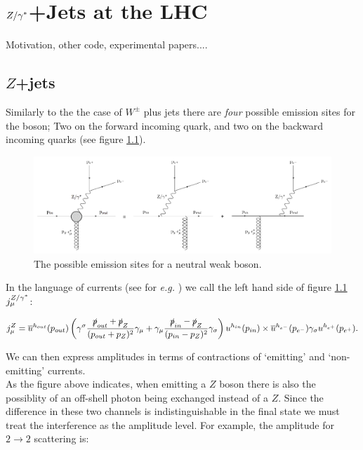 \chapter{${Z/\gamma^*}$+Jets at the LHC}
\label{chap:Zs}

	Motivation, other code, experimental papers....

	\section{$Z$+jets}
	\label{sec:Zcurrents}

		Similarly to the the case of $W^\pm$ plus jets there are \emph{four} possible emission sites for the boson; Two on the forward incoming quark, and two on the backward incoming quarks (see figure \ref{fig:emissionsites}).

		\begin{figure}[h]
		\includegraphics[width=0.98\linewidth]{figures/EmissionSites.pdf}
		\caption{The possible emission sites for a neutral weak boson.}
		\label{fig:emissionsites}
		\end{figure}

		In the language of currents (see for \emph{e.g.} \cite{Constructing}) we call the left hand side of figure \ref{fig:emissionsites} $j_\mu^{Z/\gamma^*}$:

		\begin{equation}
		j_\mu^Z = \overline{u}^{h_{out}}(p_{out})\left(\gamma^\sigma\frac{\slashed p_{out} + \slashed p_Z}{(p_{out} + p_Z)^2}\gamma_\mu + \gamma_\mu\frac{\slashed p_{in} - \slashed p_Z}{(p_{in} - p_Z)^2}\gamma_\sigma\right)u^{h_{in}}(p_{in})\times\overline{u}^{h_{e^-}}(p_{e^-})\gamma_\sigma u^{h_{e^+}}(p_{e^+}).
		\end{equation}

		We can then express amplitudes in terms of contractions of `emitting' and `non-emitting' currents.\\As the figure above indicates, when emitting a $Z$ boson there is also the possiblity of an off-shell photon being exchanged instead of a $Z$.  Since the difference in these two channels is indistinguishable 	in the final state we must treat the interference as the amplitude level.  For example, the amplitude for $2\rightarrow 2$ scattering is:

